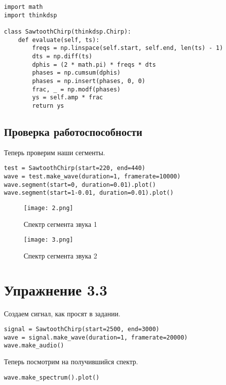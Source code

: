 \documentclass[a4paper,12pt]{report}
\begin{document}
\begin{lstlisting}[caption=Класс SawtoothChirp]
import math
import thinkdsp

class SawtoothChirp(thinkdsp.Chirp):
    def evaluate(self, ts):
        freqs = np.linspace(self.start, self.end, len(ts) - 1)
        dts = np.diff(ts)
        dphis = (2 * math.pi) * freqs * dts
        phases = np.cumsum(dphis)
        phases = np.insert(phases, 0, 0)
        frac, _ = np.modf(phases)
        ys = self.amp * frac
        return ys
\end{lstlisting}

\section{Проверка работоспособности}

Теперь проверим наши сегменты.

\begin{lstlisting}[caption=Проверка]
test = SawtoothChirp(start=220, end=440)
wave = test.make_wave(duration=1, framerate=10000)
wave.segment(start=0, duration=0.01).plot()
wave.segment(start=1-0.01, duration=0.01).plot()
\end{lstlisting}
    
\begin{figure}[H]
        \centering
        \texttt{[image: 2.png]}
        \caption{Спектр сегмента звука 1}
        \label{fig:lab3_fig2}
\end{figure}

\begin{figure}[H]
        \centering
        \texttt{[image: 3.png]}
        \caption{Спектр сегмента звука 2}
        \label{fig:lab3_fig3}
\end{figure}

\chapter{Упражнение 3.3}


Создаем сигнал, как просят в задании.

\begin{lstlisting}[caption=Создание сигнала]
signal = SawtoothChirp(start=2500, end=3000)
wave = signal.make_wave(duration=1, framerate=20000)
wave.make_audio()
\end{lstlisting}

Теперь посмотрим на получившийся спектр.

\begin{lstlisting}[caption=Визуализация спектра]
wave.make_spectrum().plot()
\end{lstlisting}
\end{document}
